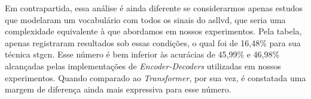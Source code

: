 Em contrapartida, essa análise é ainda diferente se considerarmos apenas estudos que modelaram um vocabulário com todos os sinais do \acrshort{asllvd}, que seria uma complexidade equivalente à que abordamos em nossos experimentos.
Pela tabela, apenas  registraram resultados sob essas condições, o qual foi de 16,48\% para sua técnica \acrshort{stgcn}. 
Esse número é bem inferior às acurácias de 45,99\% e 46,98\% alcançadas pelas implementações de \textit{Encoder-Decoders} utilizadas em nossos experimentos. Quando comparado ao \textit{Transformer}, por sua vez, é constatada uma margem de diferença ainda mais expressiva para esse número.














